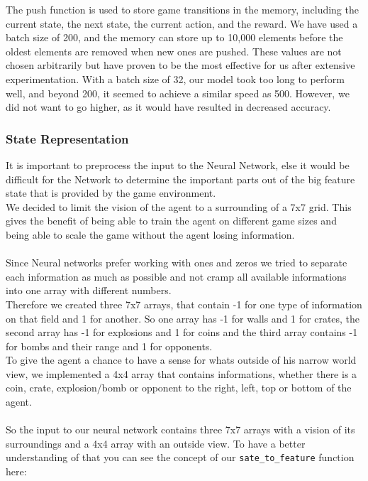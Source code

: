 The push function is used to store game transitions in the memory, including the current state, the next state, the current action, and the 
reward. We have used a batch size of 200, and the memory can store up to 10,000 elements before the oldest elements 
are removed when new ones are pushed. These values are not chosen arbitrarily but have proven to be the most effective for us 
after extensive experimentation. With a batch size of 32, our model took too long to perform well, and beyond 200, it seemed to achieve a 
similar speed as 500. However, we did not want to go higher, as it would have resulted in decreased accuracy.

\subsubsection{State Representation} \label{InFeatures}

It is important to preprocess the input to the Neural Network, else it would be difficult for the Network to determine the important parts out of the big feature state that is provided by the game environment.\\
We decided to limit the vision of the agent to a surrounding of a 7x7 grid. This gives the benefit of being able to train the agent on different game sizes and being able to scale the game without the agent losing information.\\ \\
Since Neural networks prefer working with ones and zeros we tried to separate each information as much as possible and not cramp all available informations into one array with different numbers.\\
Therefore we created three 7x7 arrays, that contain -1 for one type of information on that field and 1 for another. So one array has -1 for walls and 1 for crates, the second array has -1 for explosions and 1 for coins and the third array contains -1 for bombs and their range and 1 for opponents.\\
To give the agent a chance to have a sense for whats outside of his narrow world view, we implemented a 4x4 array that contains informations, whether there is a coin, crate, explosion/bomb or opponent to the right, left, top or bottom of the agent.\\ \\
So the input to our neural network contains three 7x7 arrays with a vision of its surroundings and a 4x4 array with an outside view.
To have a better understanding of that you can see the concept of our \verb|sate_to_feature| function here:

